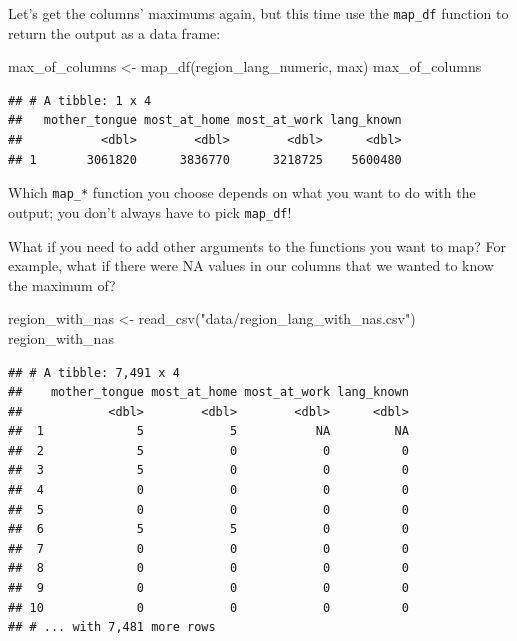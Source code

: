 \documentclass[
]{krantz}
\makeatletter
\newenvironment{Shaded}{\begin{snugshade}}{\end{snugshade}}
\newcommand{\FunctionTok}[1]{\textcolor[rgb]{0,0,0}{#1}}
\newcommand{\NormalTok}[1]{#1}
\newcommand{\OtherTok}[1]{\textcolor[rgb]{0.37,0.37,0.37}{#1}}
\newcommand{\StringTok}[1]{\textcolor[rgb]{0.5,0.5,0.5}{#1}}
\newenvironment{kframe}{%
\medskip{}
\setlength{\fboxsep}{.8em}
 \def\at@end@of@kframe{}%
 \ifinner\ifhmode%
  \def\at@end@of@kframe{\end{minipage}}%
  \begin{minipage}{\columnwidth}%
 \fi\fi%
 \def\FrameCommand##1{\hskip\@totalleftmargin \hskip-\fboxsep
 \colorbox{shadecolor}{##1}\hskip-\fboxsep
     \hskip-\linewidth \hskip-\@totalleftmargin \hskip\columnwidth}%
 \MakeFramed {\advance\hsize-\width
   \@totalleftmargin\z@ \linewidth\hsize
   \@setminipage}}%
 {\par\unskip\endMakeFramed%
 \at@end@of@kframe}
\renewenvironment{Shaded}{\begin{kframe}}{\end{kframe}}
\makeatother
\begin{document}
Let's get the columns' maximums again, but this time use the \texttt{map\_df} function to return the output as a data frame:

\begin{Shaded}
\begin{Highlighting}[]
\NormalTok{max\_of\_columns }\OtherTok{\textless{}{-}} \FunctionTok{map\_df}\NormalTok{(region\_lang\_numeric, max)}
\NormalTok{max\_of\_columns}
\end{Highlighting}
\end{Shaded}

\begin{verbatim}
## # A tibble: 1 x 4
##   mother_tongue most_at_home most_at_work lang_known
##           <dbl>        <dbl>        <dbl>      <dbl>
## 1       3061820      3836770      3218725    5600480
\end{verbatim}

Which \texttt{map\_*} function you choose depends on what you want to do with the output; you don't always have to pick \texttt{map\_df}!

What if you need to add other arguments to the functions you want to map? For example, what if there were NA values in our columns that we wanted to know the maximum of?

\begin{Shaded}
\begin{Highlighting}[]
\NormalTok{region\_with\_nas }\OtherTok{\textless{}{-}} \FunctionTok{read\_csv}\NormalTok{(}\StringTok{"data/region\_lang\_with\_nas.csv"}\NormalTok{)}
\NormalTok{region\_with\_nas}
\end{Highlighting}
\end{Shaded}

\begin{verbatim}
## # A tibble: 7,491 x 4
##    mother_tongue most_at_home most_at_work lang_known
##            <dbl>        <dbl>        <dbl>      <dbl>
##  1             5            5           NA         NA
##  2             5            0            0          0
##  3             5            0            0          0
##  4             0            0            0          0
##  5             0            0            0          0
##  6             5            5            0          0
##  7             0            0            0          0
##  8             0            0            0          0
##  9             0            0            0          0
## 10             0            0            0          0
## # ... with 7,481 more rows
\end{verbatim}
\end{document}
